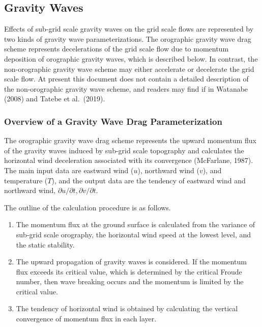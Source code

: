 \hypertarget{gravity-waves}{%
\subsection{Gravity Waves}\label{gravity-waves}}

Effects of sub-grid scale gravity waves on the grid scale flows are
represented by two kinds of gravity wave parameterizations. The
orographic gravity wave drag scheme represents decelerations of the grid
scale flow due to momentum deposition of orographic gravity waves, which
is described below. In contrast, the non-orographic gravity wave scheme
may either accelerate or decelerate the grid scale flow. At present this
document does not contain a detailed description of the non-orographic
gravity wave scheme, and readers may find if in Watanabe (2008) and
Tatebe et al.~(2019).

\hypertarget{overview-of-a-gravity-wave-drag-parameterization}{%
\subsubsection{Overview of a Gravity Wave Drag
Parameterization}\label{overview-of-a-gravity-wave-drag-parameterization}}

The orographic gravity wave drag scheme represents the upward momentum
flux of the gravity waves induced by sub-grid scale topography and
calculates the horizontal wind deceleration associated with its
convergence (McFarlane, 1987). The main input data are eastward wind
(\(u\)), northward wind (\(v\)), and temperature (\(T\)), and the output
data are the tendency of eastward wind and northward wind,
\(\partial u/\partial t, \partial v/\partial t\).

The outline of the calculation procedure is as follows.

\begin{enumerate}
\def\labelenumi{\arabic{enumi}.}
\item
  The momentum flux at the ground surface is calculated from the
  variance of sub-grid scale orography, the horizontal wind speed at the
  lowest level, and the static stability.
\item
  The upward propagation of gravity waves is considered. If the momentum
  flux exceeds its critical value, which is determined by the critical
  Froude number, then wave breaking occurs and the momentum is limited
  by the critical value.
\item
  The tendency of horizontal wind is obtained by calculating the
  vertical convergence of momentum flux in each layer.
\end{enumerate}

